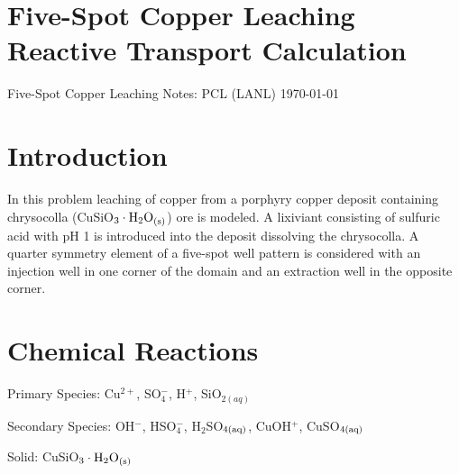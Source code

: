 \documentclass[12pt]{article}
\newcommand{\degc}{$^\circ$C}
\newcommand{\arrows}{~\rightleftharpoons~}
\begin{document}
\section*{Five-Spot Copper Leaching Reactive Transport Calculation}

Five-Spot Copper Leaching Notes: PCL (LANL) \hfill \today

\section{Introduction}

In this problem leaching of copper from a porphyry copper deposit containing chrysocolla (CuSiO$_3 \cdot {\rm H_2O}_{\rm (s)}$) ore is modeled. A lixiviant consisting of sulfuric acid with pH 1 is introduced into the deposit dissolving the chrysocolla. A quarter symmetry element of a five-spot well pattern is considered with an injection well in one corner of the domain and an extraction well in the opposite corner.

\section{Chemical Reactions}

Primary Species: Cu$^{2+}$, SO$_4^-$, H$^+$, SiO$_{2(aq)}$

\noindent
Secondary Species: OH$^-$, HSO$_4^-$, H$_2$SO$_{\rm 4(aq)}$, CuOH$^+$, CuSO$_{\rm 4(aq)}$

\noindent Solid: CuSiO$_3 \cdot {\rm H_2O}_{\rm (s)}$

\begin{comment}
\begin{center}
\begin{tabular}{rlr}
\toprule
Reaction && log $K$ (25\degc) \\
\midrule
$\rm H_2O - H^+ $ &$\arrows$ $\rm OH^-$ & $-$13.9951\\
$\rm HCO_3^- - H^+$ &$\arrows$ $\rm CO_3^{2-}$ & $-$10.3288\\
$\rm HCO_3^- + H^+ - H_2O$ &$\arrows$ $\rm CO_{2(aq)}$ & 6.3447\\
$\rm Ca^{2+} + HCO_3^- - H^+$ &$\arrows$ $\rm CaCO_{3(aq)}$ & $-$7.0017\\
$\rm Ca^{2+} + HCO_3^- $ &$\arrows$ $\rm CaHCO_3^+$ & 1.0467\\
\midrule
$\rm Ca^{2+} + HCO_3^- - H^+$ &$\arrows$ $\rm CaCO_{3(s)}$ & $-$1.8487\\
\bottomrule
\end{tabular}
\end{center}
\end{comment}
\end{document}
